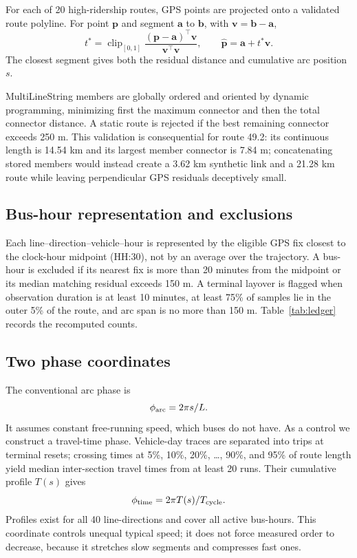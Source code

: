 \documentclass[9pt,twocolumn,twoside]{opticajnl}
\begin{document}
For each of 20 high-ridership routes, GPS points are projected onto a validated route polyline.
For point $\mathbf p$ and segment $\mathbf a$ to $\mathbf b$, with $\mathbf v=\mathbf b-\mathbf a$,
\begin{equation}
t^*=\operatorname{clip}_{[0,1]}
\frac{(\mathbf p-\mathbf a)^\top\mathbf v}{\mathbf v^\top\mathbf v},\qquad
\widehat{\mathbf p}=\mathbf a+t^*\mathbf v .
\end{equation}
The closest segment gives both the residual distance and cumulative arc position $s$.

MultiLineString members are globally ordered and oriented by dynamic programming, minimizing first
the maximum connector and then the total connector distance.  A static route is rejected if the
best remaining connector exceeds 250 m.  This validation is consequential for route 49.2: its
continuous length is 14.54 km and its largest member connector is 7.84 m; concatenating stored
members would instead create a 3.62 km synthetic link and a 21.28 km route while leaving
perpendicular GPS residuals deceptively small.

\subsection{Bus-hour representation and exclusions}

Each line--direction--vehicle--hour is represented by the eligible GPS fix closest to the clock-hour
midpoint (HH:30), not by an average over the trajectory.  A bus-hour is excluded if its nearest fix
is more than 20 minutes from the midpoint or its median matching residual exceeds 150 m.  A terminal
layover is flagged when observation duration is at least 10 minutes, at least 75\% of samples lie in
the outer 5\% of the route, and arc span is no more than 150 m.  Table~\ref{tab:ledger} records the
recomputed counts.

\subsection{Two phase coordinates}

The conventional arc phase is
\begin{equation}
\phi_{\rm arc}=2\pi s/L .
\end{equation}
It assumes constant free-running speed, which buses do not have.  As a control we construct a
travel-time phase.  Vehicle-day traces are separated into trips at terminal resets; crossing times
at 5\%, 10\%, 20\%, \ldots, 90\%, and 95\% of route length yield median inter-section travel times
from at least 20 runs.  Their cumulative profile $T(s)$ gives
\begin{equation}
\phi_{\rm time}=2\pi T(s)/T_{\rm cycle} .
\end{equation}
Profiles exist for all 40 line-directions and cover all active bus-hours.  This coordinate controls
unequal typical speed; it does not force measured order to decrease, because it stretches slow
segments and compresses fast ones.
\end{document}
